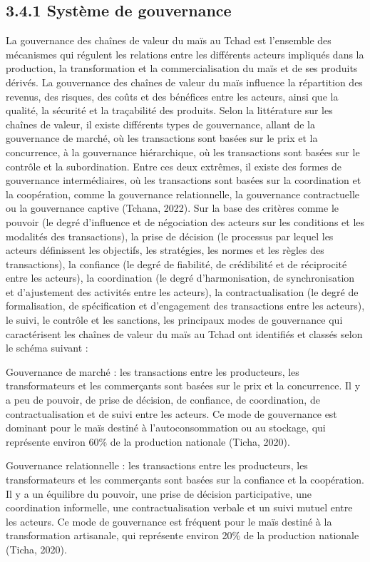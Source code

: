 \documentclass[12pt,oneside]{report}
\begin{document}
\subsection{3.4.1 Système de gouvernance}
La gouvernance des chaînes de valeur du maïs au Tchad est l'ensemble des mécanismes qui régulent les relations entre les différents acteurs impliqués dans la production, la transformation et la commercialisation du maïs et de ses produits dérivés. La gouvernance des chaînes de valeur du maïs influence la répartition des revenus, des risques, des coûts et des bénéfices entre les acteurs, ainsi que la qualité, la sécurité et la traçabilité des produits. Selon la littérature sur les chaînes de valeur, il existe différents types de gouvernance, allant de la gouvernance de marché, où les transactions sont basées sur le prix et la concurrence, à la gouvernance hiérarchique, où les transactions sont basées sur le contrôle et la subordination. Entre ces deux extrêmes, il existe des formes de gouvernance intermédiaires, où les transactions sont basées sur la coordination et la coopération, comme la gouvernance relationnelle, la gouvernance contractuelle ou la gouvernance captive (Tchana, 2022). Sur la base des critères comme le pouvoir (le degré d'influence et de négociation des acteurs sur les conditions et les modalités des transactions), la prise de décision (le processus par lequel les acteurs définissent les objectifs, les stratégies, les normes et les règles des transactions), la confiance (le degré de fiabilité, de crédibilité et de réciprocité entre les acteurs), la coordination (le degré d'harmonisation, de synchronisation et d'ajustement des activités entre les acteurs), la contractualisation (le degré de formalisation, de spécification et d'engagement des transactions entre les acteurs), le suivi, le contrôle et les sanctions, les principaux modes de gouvernance qui caractérisent les chaînes de valeur du maïs au Tchad ont identifiés et classés selon le schéma suivant :

Gouvernance de marché : les transactions entre les producteurs, les transformateurs et les commerçants sont basées sur le prix et la concurrence. Il y a peu de pouvoir, de prise de décision, de confiance, de coordination, de contractualisation et de suivi entre les acteurs. Ce mode de gouvernance est dominant pour le maïs destiné à l'autoconsommation ou au stockage, qui représente environ 60\% de la production nationale (Ticha, 2020).

Gouvernance relationnelle : les transactions entre les producteurs, les transformateurs et les commerçants sont basées sur la confiance et la coopération. Il y a un équilibre du pouvoir, une prise de décision participative, une coordination informelle, une contractualisation verbale et un suivi mutuel entre les acteurs. Ce mode de gouvernance est fréquent pour le maïs destiné à la transformation artisanale, qui représente environ 20\% de la production nationale (Ticha, 2020).
\end{document}
